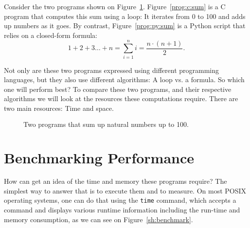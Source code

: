 \documentclass{aldast}
\begin{document}
Consider the two programs shown on
Figure~\ref{fig:sum}. Figure~\ref{prog:c:sum} is a C program that
computes this sum using a loop: It iterates from 0 to 100 and adds up
numbers as it goes. By contrast, Figure~\ref{prog:py:sum} is a Python
script that relies on a closed-form formula:
\begin{equation}
  1 + 2 + 3 \ldots + n = \sum_{i=1}^{n} i =\frac{n \cdot (n+1)}{2}.
  \label{eq:sum}
\end{equation}

Not only are these two programs expressed using different programming
languages, but they also use different algorithms: A loop vs. a
formula. So which one will perform best? To compare these two
programs, and their respective algorithms we will look at the
resources these computations require. There are two main resources:
Time and space.

\begin{figure}[htbp]
  \hfill
  \caption{Two programs that sum up natural numbers up to 100.}
  \label{fig:sum}
\end{figure}


\section{Benchmarking Performance}
How can get an idea of the time and memory these programs require? The
simplest way to answer that is to execute them and to measure. On most
POSIX operating systems, one can do that using the \texttt{time}
command, which accepts a command and displays various runtime
information including the run-time and memory consumption, as we can
see on Figure~\ref{sh:benchmark}.
\end{document}
